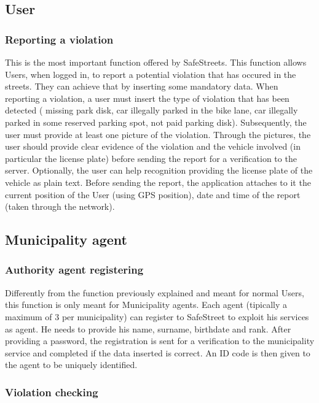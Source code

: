 \documentclass[a4paper]{report}
\begin{document}
\subsection{User}

\subsubsection{Reporting a violation}
This is the most important function offered by SafeStreets. This function allows Users, when logged in, to report a potential violation that has occured in the streets. 
They can achieve that by inserting some mandatory data. When reporting a violation, a user must insert the type of violation that has been detected ( missing park disk, car illegally parked in the bike lane, car illegally parked in some reserved parking spot, not paid parking disk).
Subsequently, the user must provide at least one picture of the violation. Through the pictures, the user should provide clear evidence of the violation and the vehicle involved (in particular the license plate) before sending the report for a verification to the server. Optionally, the user can help recognition providing the license plate of the vehicle as plain text. Before sending the report, the application attaches to it the current position of the User (using GPS position), date and time of the report (taken through the network).

\subsection{Municipality agent}
\subsubsection{Authority agent registering}
Differently from the function previously explained and meant for normal Users, this function is only meant for Municipality agents. Each agent (tipically a maximum of 3 per municipality) can register to SafeStreet to exploit his services as agent. He needs to provide his name, surname, birthdate and rank. After providing a password, the registration is sent for a verification to the municipality service and completed if the data inserted is correct. An ID code is then given to the agent to be uniquely identified.

\subsubsection{Violation checking}
\end{document}
